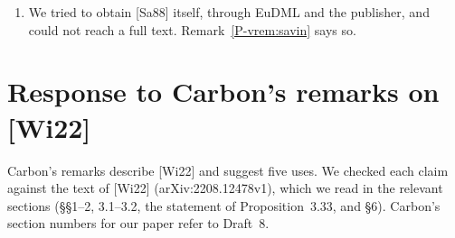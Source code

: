 \documentclass[12pt,letterpaper]{amsart}
\begin{document}
\begin{enumerate}[leftmargin=1.5em]
from Kubota's cocycle, with exact Hilbert symbols, for $\mathbb{Q}_7$
with $n=2,3,6$ and $\mathbb{Q}_5$ with $n=4$. The results agreed with
the formulas later proved. For $n=3$, $q=7$, the computed relation is
$Y^2=294\,Y+16807$. The scripts \texttt{savin\_check.py} and
\texttt{prod\_check.py} are in the folder \texttt{scripts} next to the
paper. They also confirm that Kubota's formula for the splitting of
$SL(2,\mathbb{Z}_p)$ satisfies the cocycle identity on random
elements, and that the double cosets $Bt_0^mB$ and $Bt_0^ms_1B$ are
admissible exactly when $n\mid 2m$.
\item We tried to obtain [Sa88] itself, through EuDML and the
publisher, and could not reach a full text. Remark~\ref{P-vrem:savin}
says so.
\end{enumerate}

\section{Response to Carbon's remarks on [Wi22]}
\label{sec:witthaus}

Carbon's remarks describe [Wi22] and suggest five uses. We checked each
claim against the text of [Wi22] (arXiv:2208.12478v1), which we read in
the relevant sections (\S\S1--2, 3.1--3.2, the statement of
Proposition~3.33, and \S6). Carbon's section numbers for our paper
refer to Draft~8.
\end{document}
